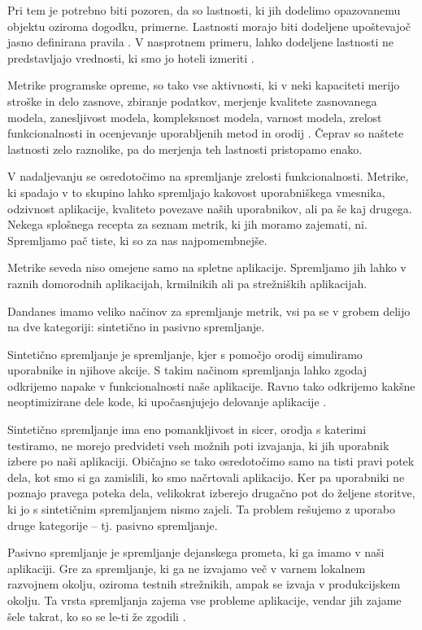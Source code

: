 \documentclass[a4paper, 12pt]{book}
\begin{document}
Pri tem je potrebno biti pozoren, da so lastnosti, ki jih dodelimo opazovanemu objektu oziroma dogodku, primerne. Lastnosti morajo biti dodeljene upoštevajoč jasno definirana pravila \cite{software_metrics}. V nasprotnem primeru, lahko dodeljene lastnosti ne predstavljajo vrednosti, ki smo jo hoteli izmeriti \cite{se_metrics}.

Metrike programske opreme, so tako vse aktivnosti, ki v neki kapaciteti merijo stroške in delo zasnove, zbiranje podatkov, merjenje kvalitete zasnovanega modela, zanesljivost modela, kompleksnost modela, varnost modela, zrelost funkcionalnosti in ocenjevanje uporabljenih metod in orodij \cite{software_metrics}. Čeprav so naštete lastnosti zelo raznolike, pa do merjenja teh lastnosti pristopamo enako.

V nadaljevanju se osredotočimo na spremljanje zrelosti funkcionalnosti. Metrike, ki spadajo v to skupino lahko spremljajo kakovost uporabniškega vmesnika, odzivnost aplikacije, kvaliteto povezave naših uporabnikov, ali pa še kaj drugega. Nekega splošnega recepta za seznam metrik, ki jih moramo zajemati, ni. Spremljamo pač tiste, ki so za nas najpomembnejše.

Metrike seveda niso omejene samo na spletne aplikacije. Spremljamo jih lahko v raznih domorodnih aplikacijah, krmilnikih ali pa strežniških aplikacijah.

Dandanes imamo veliko načinov za spremljanje metrik, vsi pa se v grobem delijo na dve kategoriji: sintetično in pasivno spremljanje.

Sintetično spremljanje je spremljanje, kjer s pomočjo orodij simuliramo uporabnike in njihove akcije. S takim načinom spremljanja lahko zgodaj odkrijemo napake v funkcionalnosti naše aplikacije. Ravno tako odkrijemo kakšne neoptimizirane dele kode, ki upočasnjujejo delovanje aplikacije \cite{what_is_rum}.

Sintetično spremljanje ima eno pomankljivost in sicer, orodja s katerimi testiramo, ne morejo predvideti vseh možnih poti izvajanja, ki jih uporabnik izbere po naši aplikaciji. Običajno se tako osredotočimo samo na tisti pravi potek dela, kot smo si ga zamislili, ko smo načrtovali aplikacijo. Ker pa uporabniki ne poznajo pravega poteka dela, velikokrat izberejo drugačno pot do željene storitve, ki jo s sintetičnim spremljanjem nismo zajeli. Ta problem rešujemo z uporabo druge kategorije – tj.  pasivno spremljanje.

Pasivno spremljanje je spremljanje dejanskega prometa, ki ga imamo v naši aplikaciji. Gre za spremljanje, ki ga ne izvajamo več v varnem lokalnem razvojnem okolju, oziroma testnih strežnikih, ampak se izvaja v produkcijskem okolju. Ta vrsta spremljanja zajema vse probleme aplikacije, vendar jih zajame šele takrat, ko so se le-ti že zgodili \cite{rum_o_reilly}.
\end{document}
